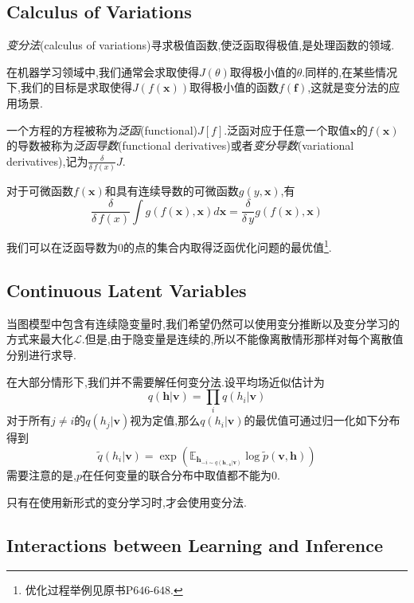 \subsection{Calculus of Variations}

\textit{变分法}(calculus of variations)寻求极值函数,使泛函取得极值,是处理函数的领域.

在机器学习领域中,我们通常会求取使得$J(\theta)$取得极小值的$\theta$.同样的,在某些情况下,我们的目标是求取使得$J(f(\mathbf x))$取得极小值的函数$f(\mathbf f)$,这就是变分法的应用场景.

一个方程的方程被称为\textit{泛函}(functional)$J[f]$.泛函对应于任意一个取值$\mathbf x$的$f(\mathbf x)$的导数被称为\textit{泛函导数}(functional derivatives)或者\textit{变分导数}(variational derivatives),记为$\frac{\delta}{\delta\,f(x)}J$.

对于可微函数$f(\mathbf x)$和具有连续导数的可微函数$g(y,\mathbf x)$,有
\begin{equation}
\frac{\delta}{\delta\,f(x)}\int g(f(\mathbf x),\mathbf x)d\mathbf x=\frac{\delta}{\delta\,y}g(f(\mathbf x),\mathbf x)
\end{equation}

我们可以在泛函导数为$0$的点的集合内取得泛函优化问题的最优值\footnote{优化过程举例见原书P$646$-$648$.}.

\subsection{Continuous Latent Variables}

当图模型中包含有连续隐变量时,我们希望仍然可以使用变分推断以及变分学习的方式来最大化$\mathcal L$.但是,由于隐变量是连续的,所以不能像离散情形那样对每个离散值分别进行求导.

在大部分情形下,我们并不需要解任何变分法.设平均场近似估计为
\begin{equation}
q(\mathbf{h|v})=\prod_iq(h_i|\mathbf v)
\end{equation}
对于所有$j\ne i$的$q(h_j|\mathbf v)$视为定值,那么$q(h_i|\mathbf v)$的最优值可通过归一化如下分布得到
\begin{equation}
\tilde q(h_i|\mathbf v)=\exp(\mathbb E_{\mathbf h_{-i\sim q(\mathbf{h_{-1}|v})}}\log\tilde p(\mathbf{v,h}))
\end{equation}
需要注意的是,$p$在任何变量的联合分布中取值都不能为$0$.

只有在使用新形式的变分学习时,才会使用变分法.

\subsection{Interactions between Learning and Inference}

